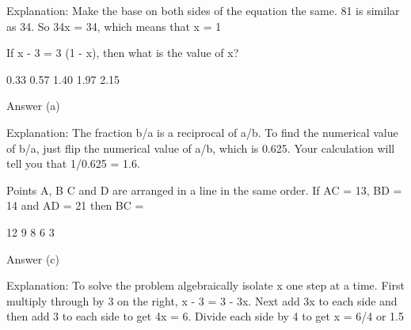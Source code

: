 




    Explanation: Make the base on both sides of the equation the same. 
    81 is similar as 34. So 34x  = 34, which means that x = 1

    If x - 3 = 3 (1 - x), then what is the value of x?

        0.33
        0.57
        1.40
        1.97
        2.15 

    Answer (a)

    Explanation: The fraction b/a is a reciprocal of a/b. To find the numerical value of b/a, just flip the numerical value of a/b, which is 0.625. Your calculation will tell you that 1/0.625 = 1.6.

    Points A, B C and D are arranged in a line in the same order. If AC = 13, BD = 14 and AD = 21 then BC =

        12
        9
        8
        6
        3 

    Answer (c)

    Explanation: To solve the problem algebraically isolate x one step at a time. First multiply through by 3 on the right, x - 3 = 3 - 3x. Next add 3x to each side and then add 3 to each side to get 4x = 6. Divide each side by 4 to get x = 6/4 or 1.5

